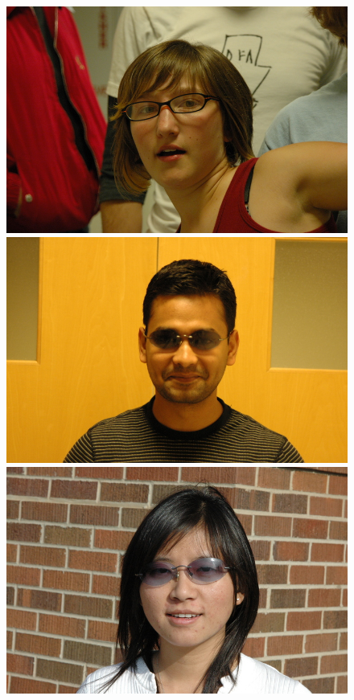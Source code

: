 \begin{figure}
\includegraphics[scale=0.35,clip=true]{figures_cvpr/examples/2/DSC_1874.JPG} \\
\includegraphics[scale=0.35,clip=true]{figures_cvpr/examples/3/DSC_1572.JPG} 
\includegraphics[scale=0.35,clip=true]{figures_cvpr/examples/3/DSC_1587.JPG} 

\end{figure}
